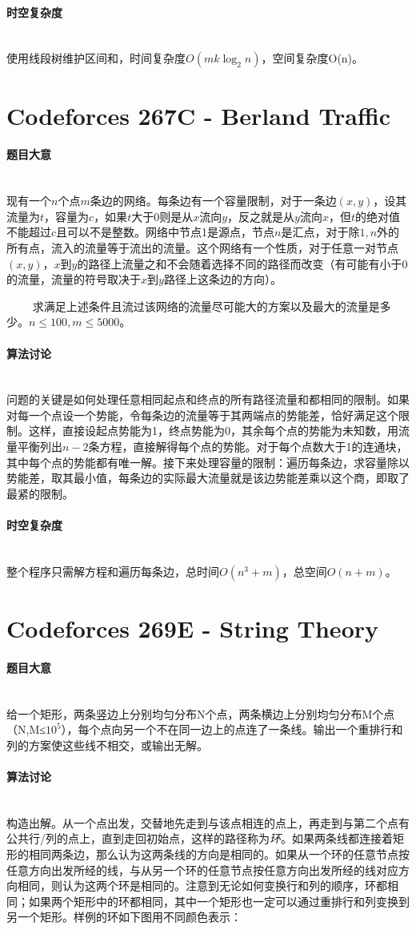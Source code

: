 \documentclass[UTF8]{ctexart}
\newcommand{\myparagraph}[1]{\paragraph{#1}\mbox{}\\}
\theoremstyle{nonumberplain}
\begin{document}
		\myparagraph{时空复杂度}
			
			使用线段树维护区间和，时间复杂度$O(mk\log_2{n})$，空间复杂度O(n)。
	
	\section{Codeforces 267C - Berland Traffic}
	
		\myparagraph{题目大意}
		
			现有一个$n$个点$m$条边的网络。每条边有一个容量限制，对于一条边$(x,y)$，设其流量为$t$，容量为$c$，如果$t$大于0则是从$x$流向$y$，反之就是从$y$流向$x$，但$t$的绝对值不能超过$c$且可以不是整数。网络中节点1是源点，节点$n$是汇点，对于除$1,n$外的所有点，流入的流量等于流出的流量。这个网络有一个性质，对于任意一对节点$(x,y)$，$x$到$y$的路径上流量之和不会随着选择不同的路径而改变（有可能有小于0的流量，流量的符号取决于$x$到$y$路径上这条边的方向）。
			
　　		求满足上述条件且流过该网络的流量尽可能大的方案以及最大的流量是多少。$n \leq 100, m \leq 5000$。
		
		\myparagraph{算法讨论}
		
			问题的关键是如何处理任意相同起点和终点的所有路径流量和都相同的限制。如果对每一个点设一个势能，令每条边的流量等于其两端点的势能差，恰好满足这个限制。这样，直接设起点势能为1，终点势能为0，其余每个点的势能为未知数，用流量平衡列出$n-2$条方程，直接解得每个点的势能。对于每个点数大于1的连通块，其中每个点的势能都有唯一解。接下来处理容量的限制：遍历每条边，求容量除以势能差，取其最小值，每条边的实际最大流量就是该边势能差乘以这个商，即取了最紧的限制。
		
		\myparagraph{时空复杂度}
		
			整个程序只需解方程和遍历每条边，总时间$O(n^3+m)$，总空间$O(n+m)$。
	
	\section{Codeforces 269E - String Theory}
	
		\myparagraph{题目大意}
			
			给一个矩形，两条竖边上分别均匀分布N个点，两条横边上分别均匀分布M个点（N,M≤$10^5$），每个点向另一个不在同一边上的点连了一条线。输出一个重排行和列的方案使这些线不相交，或输出无解。
			
		\myparagraph{算法讨论}
		
			构造出解。从一个点出发，交替地先走到与该点相连的点上，再走到与第二个点有公共行/列的点上，直到走回初始点，这样的路径称为\emph{环}。如果两条线都连接着矩形的相同两条边，那么认为这两条线的方向是相同的。如果从一个环的任意节点按任意方向出发所经的线，与从另一个环的任意节点按任意方向出发所经的线对应方向相同，则认为这两个环是相同的。注意到无论如何变换行和列的顺序，环都相同；如果两个矩形中的环都相同，其中一个矩形也一定可以通过重排行和列变换到另一个矩形。样例的环如下图用不同颜色表示：
			
\end{document}
